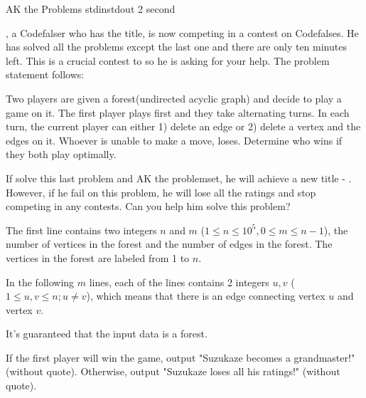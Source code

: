 
\begin{problem}{AK the Problems}
{stdin}{stdout}
{2 second}{}{}

\Suzukaze, a Codefalser who has the \master title, is now competing in a contest on Codefalses. He has solved all the problems except the last one and there are only ten minutes left. This is a crucial contest to \Suzukaze so he is asking for your help. The problem statement follows:

\par
Two players are given a forest(undirected acyclic graph) and decide to play a game on it. The first player plays first and they take alternating turns. In each turn, the current player can either 1) delete an edge or 2) delete a vertex and the edges on it. Whoever is unable to make a move, loses. Determine who wins if they both play optimally.

\par
If \Suzukaze  solve this last problem and AK the problemset, he will achieve a new title - \grandmaster. However, if he fail on this problem, he will lose all the ratings and stop competing in any contests. Can you help him solve this problem? 

\InputFile

The first line contains two integers $n$ and $m$ ($1 \le n \le 10^5,0 \le m \le n-1 $), the number of vertices in the forest and the number of edges in the forest. The vertices in the forest are labeled from 1 to $n$.

In the following $m$ lines, each of the lines contains 2 integers $u, v$ ($1 \le u,v \le n; u \neq v$), which means that there is an edge connecting vertex $u$ and vertex $v$.

It's guaranteed that the input data is a forest.

\OutputFile

If the first player will win the game, output "Suzukaze becomes a grandmaster!" (without quote). Otherwise, output "Suzukaze loses all his ratings!" (without quote).

\Examples

\begin{example}
%
\end{example}

\end{problem}